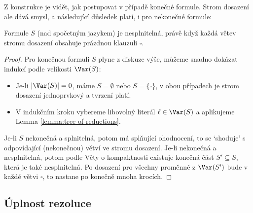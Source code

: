 
Z konstrukce je vidět, jak postupovat v případě konečné formule. Strom dosazení ale dává smysl, a následující důsledek platí, i pro nekonečné formule:


\begin{corollary}
    Formule $S$ (nad spočetným jazykem) je nesplnitelná, právě když každá větev stromu dosazení obsahuje prázdnou klauzuli $\square$.
\end{corollary}

\begin{proof}
    Pro konečnou formuli $S$ plyne z diskuze výše, můžeme snadno dokázat indukcí podle velikosti $\Var(S)$: 
    \begin{itemize}
        \item Je-li $|\Var(S)|=0$, máme $S=\emptyset$ nebo $S=\{\square\}$, v obou případech je strom dosazení jednoprvkový a tvrzení platí. 
        \item V indukčním kroku vybereme libovolný literál $\ell\in\Var(S)$ a aplikujeme Lemma \ref{lemma:tree-of-reductions}.
    \end{itemize} 
Je-li $S$ nekonečná a splnitelná, potom má splňující ohodnocení, to se `shoduje' s odpovídající (nekonečnou) větví ve stromu dosazení. Je-li nekonečná a nesplnitelná, potom podle Věty o kompaktnosti existuje konečná část $S'\subseteq S$, která je také nesplnitelná. Po dosazení pro všechny proměnné z $\Var(S')$ bude v každé větvi $\square$, to nastane po konečně mnoha krocích.
\end{proof}

\subsection{Úplnost rezoluce}

